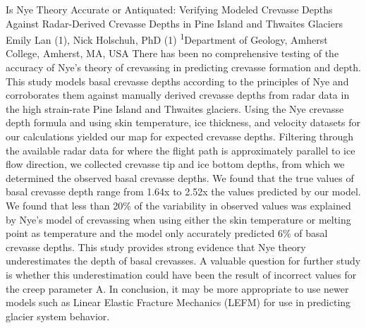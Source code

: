\makeabstract
{
Is Nye Theory Accurate or Antiquated: Verifying Modeled Crevasse Depths Against Radar-Derived Crevasse Depths in Pine Island and Thwaites Glaciers
}
{
Emily Lan (1), Nick Holschuh, PhD (1)
}
{
\textsuperscript{1}Department of Geology, Amherst College, Amherst, MA, USA
}
{
There has been no comprehensive testing of the accuracy of Nye's theory of crevassing in predicting crevasse formation and depth. This study models basal crevasse depths according to the principles of Nye and corroborates them against manually derived crevasse depths from radar data in the high strain-rate Pine Island and Thwaites glaciers.
}
{
Using the Nye crevasse depth formula and using skin temperature, ice thickness, and velocity datasets for our calculations yielded our map for expected crevasse depths. Filtering through the available radar data for where the flight path is approximately parallel to ice flow direction, we collected crevasse tip and ice bottom depths, from which we determined the observed basal crevasse depths.
}
{
We found that the true values of basal crevasse depth range from 1.64x to 2.52x the values predicted by our model. We found that less than 20\% of the variability in observed values was explained by Nye’s model of crevassing when using either the skin temperature or melting point as temperature and the model only accurately predicted 6\% of basal crevasse depths.
}
{
This study provides strong evidence that Nye theory underestimates the depth of basal crevasses. A valuable question for further study is whether this underestimation could have been the result of incorrect values for the creep parameter A. In conclusion, it may be more appropriate to use newer models such as Linear Elastic Fracture Mechanics (LEFM) for use in predicting glacier system behavior.
}

\newpage
